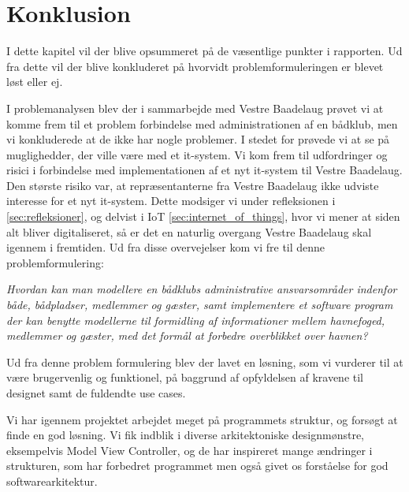 \chapter{Konklusion}
\label{cha:konklusion}
I dette kapitel vil der blive opsummeret på de væsentlige punkter i rapporten. Ud fra dette vil der blive konkluderet på hvorvidt problemformuleringen er blevet løst eller ej.


I problemanalysen blev der i sammarbejde med Vestre Baadelaug prøvet vi at komme frem til et problem forbindelse med administrationen af en bådklub, men vi konkluderede at de ikke har nogle problemer. I stedet for prøvede vi at se på muglighedder, der ville være med et it-system. Vi kom frem til udfordringer og risici i forbindelse med implementationen af et nyt it-system til Vestre Baadelaug. Den største risiko var, at repræsentanterne fra Vestre Baadelaug ikke udviste interesse for et nyt it-system. Dette modsiger vi under refleksionen i \cref{sec:refleksioner}, og delvist i IoT \cref{sec:internet_of_things}, hvor vi mener at siden alt bliver digitaliseret, så er det en naturlig overgang Vestre Baadelaug skal igennem i fremtiden. Ud fra disse overvejelser kom vi fre til denne problemformulering:

\begin{displayquote}
\textit{Hvordan kan man modellere en bådklubs administrative ansvarsområder indenfor både, bådpladser, medlemmer og gæster, samt implementere et software program der kan benytte modellerne til formidling af informationer mellem havnefoged, medlemmer og gæster, med det formål at forbedre overblikket over havnen?}
\end{displayquote}


Ud fra denne problem formulering blev der lavet en løsning, som vi vurderer til at være brugervenlig og funktionel, på baggrund af opfyldelsen af kravene til designet samt de fuldendte use cases.

Vi har igennem projektet arbejdet meget på programmets struktur, og forsøgt at finde en god løsning. Vi fik indblik i diverse arkitektoniske designmønstre, eksempelvis Model View Controller, og de har inspireret mange ændringer i strukturen, som har forbedret programmet men også givet os forståelse for god softwarearkitektur.


